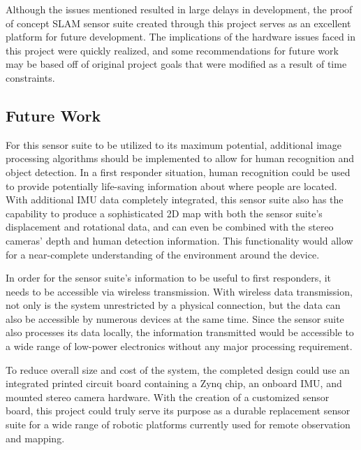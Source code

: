 \par
Although the issues mentioned resulted in large delays in development, the proof of concept SLAM sensor suite created through this project serves as an excellent platform for future development. The implications of the hardware issues faced in this project were quickly realized, and some recommendations for future work may be based off of original project goals that were modified as a result of time constraints.

\subsection{Future Work}
For this sensor suite to be utilized to its maximum potential, additional image processing algorithms should be implemented to allow for human recognition and object detection. In a first responder situation, human recognition could be used to provide potentially life-saving information about where people are located. With additional IMU data completely integrated, this sensor suite also has the capability to produce a sophisticated 2D map with both the sensor suite's displacement and rotational data, and can even be combined with the stereo cameras' depth and human detection information. This functionality would allow for a near-complete understanding of the environment around the device.
\par
In order for the sensor suite's information to be useful to first responders, it needs to be accessible via wireless transmission. With wireless data transmission, not only is the system unrestricted by a physical connection, but the data can also be accessible by numerous devices at the same time. Since the sensor suite also processes its data locally, the information transmitted would be accessible to a wide range of low-power electronics without any major processing requirement.
\par
To reduce overall size and cost of the system, the completed design could use an integrated printed circuit board containing a Zynq chip, an onboard IMU, and mounted stereo camera hardware. With the creation of a customized sensor board, this project could truly serve its purpose as a durable replacement sensor suite for a wide range of robotic platforms currently used for remote observation and mapping. 




